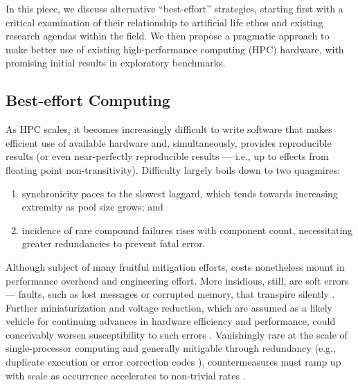 In this piece, we discuss alternative ``best-effort'' strategies, starting first with a critical examination of their relationship to artificial life ethos and existing research agendas within the field.
We then propose a pragmatic approach to make better use of existing high-performance computing (HPC) hardware, with promising initial results in exploratory benchmarks.

\subsection{Best-effort Computing}

As HPC scales, it becomes increasingly difficult to write software that makes efficient use of available hardware and, simultaneously, provides reproducible results (or even near-perfectly reproducible results --- i.e., up to effects from floating point non-transitivity).
Difficulty largely boils down to two quagmires:
\begin{enumerate}
\item synchronicity paces to the slowest laggard, which tends towards increasing extremity as pool size grows; and
\item incidence of rare compound failures rises with component count, necessitating greater redundancies to prevent fatal error.
\end{enumerate}
Although subject of many fruitful mitigation efforts, costs nonetheless mount in performance overhead and engineering effort.
More insidious, still, are soft errors --- faults, such as lost messages or corrupted memory, that transpire silently \citep{karnik2004characterization}.
Further miniaturization and voltage reduction, which are assumed as a likely vehicle for continuing advances in hardware efficiency and performance, could conceivably worsen susceptibility to such errors \citep{dongarra2014applied,kajmakovic2020challenges}.
Vanishingly rare at the scale of single-processor computing and generally mitigable through redundancy (e.g., duplicate execution or error correction codes \citep{vankeirsbilck2015soft,sridharan2015memory}), countermeasures must ramp up with scale as occurrence accelerates to non-trivial rates \citep{sridharan2015memory,scoles2018cosmic}.

